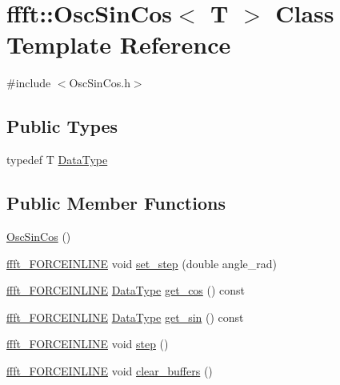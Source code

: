 \hypertarget{classffft_1_1OscSinCos}{}\section{ffft\+:\+:Osc\+Sin\+Cos$<$ T $>$ Class Template Reference}
\label{classffft_1_1OscSinCos}


{\ttfamily \#include $<$Osc\+Sin\+Cos.\+h$>$}

\subsection*{Public Types}
\begin{DoxyCompactItemize}
\item 
typedef T \hyperlink{classffft_1_1OscSinCos_af91237051e92ce0af7aaf38b1826244d}{Data\+Type}
\end{DoxyCompactItemize}
\subsection*{Public Member Functions}
\begin{DoxyCompactItemize}
\item 
\hyperlink{classffft_1_1OscSinCos_aed332791021f51d86b05594629244f1e}{Osc\+Sin\+Cos} ()
\item 
\hyperlink{def_8h_a31b2ada863c9efa7455efae4e13661f3}{ffft\+\_\+\+F\+O\+R\+C\+E\+I\+N\+L\+I\+NE} void \hyperlink{classffft_1_1OscSinCos_ad41139a76b16a5af136d1e730a9143dc}{set\+\_\+step} (double angle\+\_\+rad)
\item 
\hyperlink{def_8h_a31b2ada863c9efa7455efae4e13661f3}{ffft\+\_\+\+F\+O\+R\+C\+E\+I\+N\+L\+I\+NE} \hyperlink{classffft_1_1OscSinCos_af91237051e92ce0af7aaf38b1826244d}{Data\+Type} \hyperlink{classffft_1_1OscSinCos_aa903b64bed3d46a27aeb5af7d7154eb3}{get\+\_\+cos} () const 
\item 
\hyperlink{def_8h_a31b2ada863c9efa7455efae4e13661f3}{ffft\+\_\+\+F\+O\+R\+C\+E\+I\+N\+L\+I\+NE} \hyperlink{classffft_1_1OscSinCos_af91237051e92ce0af7aaf38b1826244d}{Data\+Type} \hyperlink{classffft_1_1OscSinCos_a3e336802d9e10288483d477bfdf50c20}{get\+\_\+sin} () const 
\item 
\hyperlink{def_8h_a31b2ada863c9efa7455efae4e13661f3}{ffft\+\_\+\+F\+O\+R\+C\+E\+I\+N\+L\+I\+NE} void \hyperlink{classffft_1_1OscSinCos_a442975ce6388271ea78998c080364e08}{step} ()
\item 
\hyperlink{def_8h_a31b2ada863c9efa7455efae4e13661f3}{ffft\+\_\+\+F\+O\+R\+C\+E\+I\+N\+L\+I\+NE} void \hyperlink{classffft_1_1OscSinCos_a1be4a9ec10517ae2615d2925c05d7d29}{clear\+\_\+buffers} ()
\end{DoxyCompactItemize}
